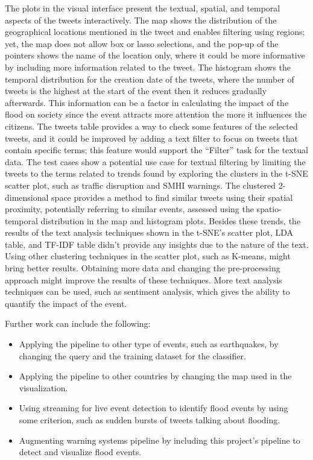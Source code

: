 The plots in the visual interface present the textual, spatial, and temporal aspects of the tweets
interactively. The map shows the distribution of the geographical locations mentioned in the tweet
and enables filtering using regions; yet, the map does not allow box or lasso selections, and the
pop-up of the pointers shows the name of the location only, where it could be more informative by
including more information related to the tweet. The histogram shows the temporal distribution for
the creation date of the tweets, where the number of tweets is the highest at the start of the event
then it reduces gradually afterwards. This information can be a factor in calculating the impact of
the flood on society since the event attracts more attention the more it influences the citizens.
The tweets table provides a way to check some features of the selected tweets, and it could be
improved by adding a text filter to focus on tweets that contain specific terms; this feature would
support the ``Filter'' task for the textual data. The test cases show a potential use case for
textual filtering by limiting the tweets to the terms related to trends found by exploring the
clusters in the \ac{t-SNE} scatter plot, such as traffic disruption and \ac{SMHI} warnings. The
clustered 2-dimensional space provides a method to find similar tweets using their spatial
proximity, potentially referring to similar events, assessed using the spatio-temporal distribution
in the map and histogram plots. Besides these trends, the results of the text analysis techniques
shown in the \ac{t-SNE}'s scatter plot, \ac{LDA} table, and \ac{TF-IDF} table didn't provide any
insights due to the nature of the text. Using other clustering techniques in the scatter plot, such
as K-means, might bring better results. Obtaining more data and changing the pre-processing approach
might improve the results of these techniques. More text analysis techniques can be used, such as
sentiment analysis, which gives the ability to quantify the impact of the event.

Further work can include the following:
\begin{itemize}
  \item Applying the pipeline to other type of events, such as earthquakes, by changing the query
    and the training dataset for the classifier.
  \item Applying the pipeline to other countries by changing the map used in the visualization.
  \item Using streaming for live event detection to identify flood events by using some criterion,
    such as sudden bursts of tweets talking about flooding.
  \item Augmenting warning systems pipeline by including this project's pipeline to detect and visualize flood events.
\end{itemize}
